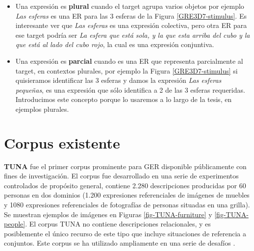 \begin{itemize}
\item Una expresi\'on es {\bf plural} cuando el target agrupa varios objetos por ejemplo {\it Las esferas} es una ER para las 3 esferas de la Figura \ref{GRE3D7-stimulus}. Es interesante ver que {\it Las esferas} es una expresi\'on colectiva, pero otra ER para ese target podr\'ia ser {\it La esfera que est\'a sola, y la que esta arriba del cubo y la que est\'a al lado del cubo rojo}, la cual es una expresi\'on conjuntiva.

\item Una expresi\'on es {\bf parcial} cuando es una ER que representa parcialmente al target, en contextos plurales, por ejemplo la Figura \ref{GRE3D7-stimulus} si quisieramos identificar las 3 esferas y damos la expresi\'on {\it Las esferas peque\~nas}, es una expresi\'on que s\'olo identifica a 2 de las 3 esferas requeridas. Introducimos este concepto porque lo usaremos a lo largo de la tesis, en ejemplos plurales. 
\end{itemize}




\section{Corpus existente}
\label{sec:corpus2}
\label{sec:corpusTUNA}


{\bf TUNA} \cite{tuna-corpus} fue el primer corpus prominente para GER disponible p\'ublicamente con fines de investigaci\'on. El corpus fue desarrollado en una serie de experimentos controlados de prop\'osito general, contiene 2.280 descripciones producidas por 60 personas en dos dominios (1.200 expresiones referenciales de im\'agenes de muebles y 1080 expresiones referenciales de fotograf\'ias de personas situadas en una grilla). Se muestran ejemplos de im\'agenes en Figuras \ref{fig-TUNA-furniture} y \ref{fig-TUNA-people}. El corpus TUNA no contiene descripciones relacionales, y es posiblemente el \'unico recurso de este tipo que incluye situaciones de referencia a conjuntos. Este corpus se ha utilizado ampliamente en una serie de desaf\'ios \cite{reg2009}. 

